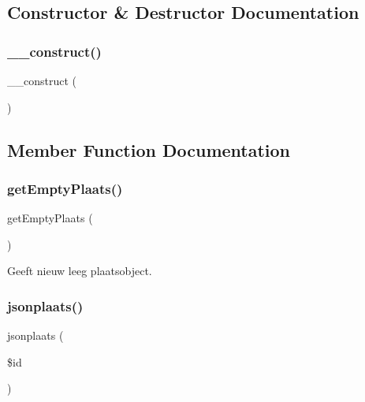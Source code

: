 \subsection{Constructor \& Destructor Documentation}
\mbox{\label{class_plaats_a095c5d389db211932136b53f25f39685}} 
\subsubsection{\texorpdfstring{\+\_\+\+\_\+construct()}{\_\_construct()}}
{\footnotesize\ttfamily \+\_\+\+\_\+construct (\begin{DoxyParamCaption}{ }\end{DoxyParamCaption})}



\subsection{Member Function Documentation}
\mbox{\label{class_plaats_a3a5c8647f1efcdff577c49894a2bdde8}} 
\subsubsection{\texorpdfstring{get\+Empty\+Plaats()}{getEmptyPlaats()}}
{\footnotesize\ttfamily get\+Empty\+Plaats (\begin{DoxyParamCaption}{ }\end{DoxyParamCaption})}



Geeft nieuw leeg plaatsobject. 

\mbox{\label{class_plaats_aeac29d4165c8a50a862fe3e8df220376}} 
\subsubsection{\texorpdfstring{jsonplaats()}{jsonplaats()}}
{\footnotesize\ttfamily jsonplaats (\begin{DoxyParamCaption}\item[{}]{\$id }\end{DoxyParamCaption})}



